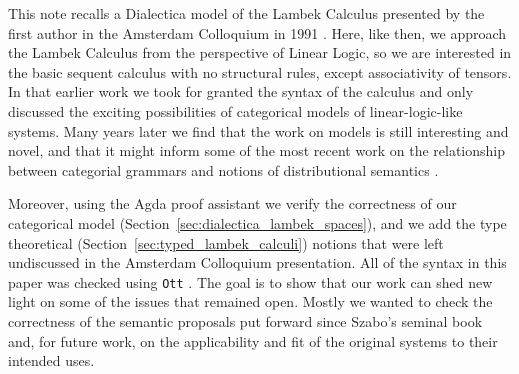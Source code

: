 \documentclass{llncs}
\begin{document}
This note recalls a Dialectica model of the Lambek Calculus presented
by the first author in the Amsterdam Colloquium in 1991
\cite{depaiva1991}. Here, like then, we approach the Lambek Calculus
from the perspective of Linear Logic, so we are interested in the
basic sequent calculus with no structural rules, except associativity
of tensors. In that earlier work we took for granted the syntax of the
calculus and only discussed the exciting possibilities of categorical
models of linear-logic-like systems.  Many years later we find that
the work on models is still interesting and novel, and that it might
inform some of the most recent work on the relationship between
categorial grammars and notions of distributional semantics
\cite{coecke2013}.


Moreover, using the Agda proof assistant \cite{bove2009} we verify the
correctness of our categorical model
(Section~\ref{sec:dialectica_lambek_spaces}), and we add the type
theoretical (Section~\ref{sec:typed_lambek_calculi}) notions that were
left undiscussed in the Amsterdam Colloquium presentation.  All of the
syntax in this paper was checked using \texttt{Ott}
\cite{Sewell:2010}.  The goal is to show that our work can shed new
light on some of the issues that remained open.  Mostly we wanted to
check the correctness of the semantic proposals put forward since
Szabo's seminal book \cite{szabo1978} and, for future work, on the
applicability and fit of the original systems to their intended uses.
\end{document}
